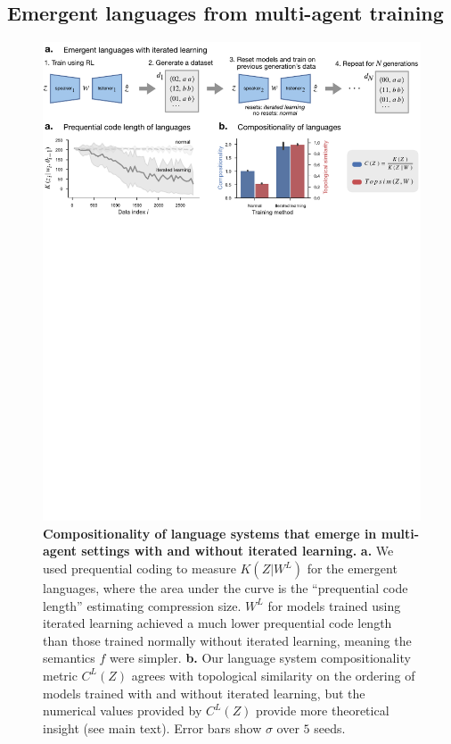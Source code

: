 \documentclass{article} %
\begin{document}
\subsection{Emergent languages from multi-agent training}
\label{sec:emergent}

\begin{figure}[ht]
    \centering
    \includegraphics[width=\linewidth]{figures/emergent_short.pdf}
    \caption{\textbf{Compositionality of language systems that emerge in multi-agent settings with and without iterated learning.} \textbf{a.} We used prequential coding to measure $K(Z | W^L)$ for the emergent languages, where the area under the curve is the ``prequential code length'' estimating compression size. $W^L$ for models trained using iterated learning achieved a much lower prequential code length than those trained normally without iterated learning, meaning the semantics $f$ were simpler. \textbf{b.} Our language system compositionality metric $C^L(Z)$ agrees with topological similarity on the ordering of models trained with and without iterated learning, but the numerical values provided by $C^L(Z)$ provide more theoretical insight (see main text). Error bars show $\sigma$ over $5$ seeds.}
    \label{fig:emergent}
\end{figure}
\end{document}
